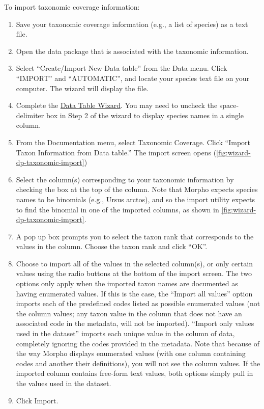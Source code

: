 To import taxonomic coverage information:
\begin{enumerate}
  \item Save your taxonomic coverage information (e.g., a list of
    species) as a text file.
  \item Open the data package that is associated with the taxonomic
    information.
  \item Select ``Create/Import New Data table'' from the Data menu.
    Click ``IMPORT'' and ``AUTOMATIC'', and locate your species text
    file on your computer. The wizard will display the file.
  \item Complete the \hyperref[sec:adding-data]{Data Table Wizard}. You
    may need to uncheck the space-delimiter box in Step 2 of the wizard
    to display species names in a single column. 
  \item From the Documentation menu, select Taxonomic Coverage. Click
    ``Import Taxon Information from Data table.'' The import screen
    opens (\autoref{fig:wizard-dp-taxonomic-import})
  \item Select the column(s) corresponding to your taxonomic information
    by checking the box at the top of the column. Note that Morpho
    expects species names to be binomials (e.g., Ursus arctos), and so
    the import utility expects to find the binomial in one of the
    imported columns, as shown in
    \autoref{fig:wizard-dp-taxonomic-import}.
  \item A pop up box prompts you to select the taxon rank that
    corresponds to the values in the column. Choose the taxon rank and
    click ``OK''.
  \item Choose to import all of the values in the selected column(s), or
    only certain values using the radio buttons at the bottom of the
    import screen. The two options only apply when the imported taxon
    names are documented as having enumerated values. If this is the
    case, the ``Import all values'' option imports each of the
    predefined codes listed as possible enumerated values (not the
    column values; any taxon value in the column that does not have an
    associated code in the metadata, will not be imported). ``Import
    only values used in the dataset'' imports each unique value in the
    column of data, completely ignoring the codes provided in the
    metadata. Note that because of the way Morpho displays enumerated
    values (with one column containing codes and another their
    definitions), you will not see the column values. If the imported
    column contains free-form text values, both options simply pull in
    the values used in the dataset.
  \item Click Import.
\end{enumerate}

